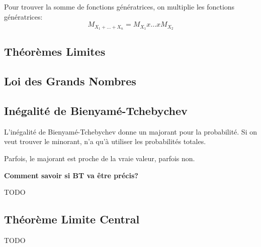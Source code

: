 \documentclass{article}
\begin{document}
Pour trouver la somme de fonctions génératrices, on multiplie les fonctions
génératrices:
$$ M_{X_1 + ... + X_n} = M_{X_1} x ... x M_{X_2} $$

\subsection{Théorèmes Limites}

\subsection{Loi des Grands Nombres}
\subsection{Inégalité de Bienyamé-Tchebychev}

L'inégalité de Bienyamé-Tchebychev donne un majorant pour la probabilité.
Si on veut trouver le minorant, n'a qu'à utiliser les probabilités totales.

Parfois, le majorant est proche de la vraie valeur, parfois non.

\textbf{Comment savoir si BT va être précis?}

TODO

\subsection{Théorème Limite Central}

TODO
\end{document}
